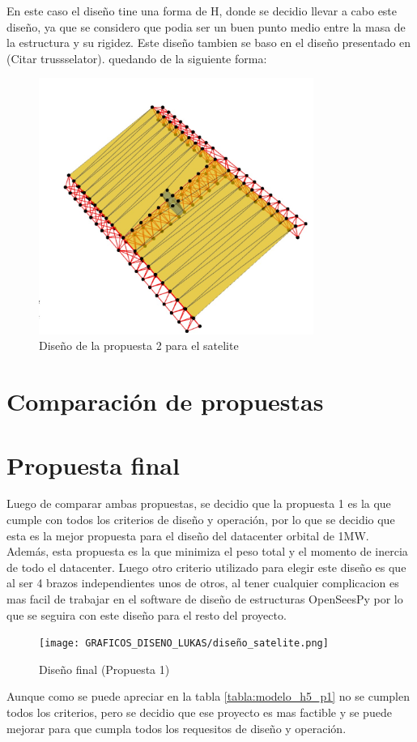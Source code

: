 En este caso el diseño tine una forma de H, donde se decidio llevar a cabo este diseño, ya que se considero que podia ser un buen punto medio entre la masa de la estructura y su rigidez. Este diseño tambien se baso en el diseño presentado en (Citar trussselator). quedando de la siguiente forma:

\begin{figure}[H]
    \centering
    \includegraphics[width=0.8\textwidth]{GRAFICOS_DISENO_BENO/propuesta2.png}
    \caption{Diseño de la propuesta 2 para el satelite}
    \label{fig:propuesta2}
\end{figure}

\newpage
\section{Comparación de propuestas}


\newpage
\section{Propuesta final}

Luego de comparar ambas propuestas, se decidio que la propuesta 1 es la que cumple con todos los criterios de diseño y operación, por lo que se decidio que esta es la mejor propuesta para el diseño del datacenter orbital de 1MW. Además, esta propuesta es la que minimiza el peso total y el momento de inercia de todo el datacenter. Luego otro criterio utilizado para elegir este diseño es que al ser 4 brazos independientes unos de otros, al tener cualquier complicacion es mas facil de trabajar en el software de diseño de estructuras OpenSeesPy por lo que se seguira con este diseño para el resto del proyecto.

\begin{figure}[H]
    \centering
    \texttt{[image: GRAFICOS\_DISENO\_LUKAS/diseño\_satelite.png]}
    \caption{Diseño final (Propuesta 1)}
    \label{fig:propuesta1}
\end{figure}

Aunque como se puede apreciar en la tabla \ref{tabla:modelo_h5_p1} no se cumplen todos los criterios, pero se decidio que ese proyecto es mas factible y se puede mejorar para que cumpla todos los requesitos de diseño y operación.